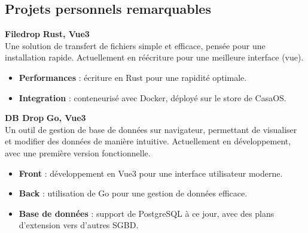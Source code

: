 \documentclass[a4paper,10pt]{article}
\begin{document}
\begin{paracol}{2}
\begin{flushleft}
  \section*{Projets personnels remarquables}

  \textbf{Filedrop} \hfill \textbf{Rust, Vue3} \\
  Une solution de transfert de fichiers simple et efficace, pensée pour une installation rapide.
  Actuellement en réécriture pour une meilleure interface (vue).
  \begin{itemize}[left=0pt,label={--},nosep]
    \item \textbf{Performances} : écriture en Rust pour une rapidité optimale.
    \item \textbf{Integration} : conteneurisé avec Docker, déployé sur le store de CasaOS.
  \end{itemize}
  \vspace{1em}

  \textbf{DB Drop} \hfill \textbf{Go, Vue3} \\
  Un outil de gestion de base de données sur navigateur, permettant de visualiser et modifier des données de manière intuitive.
  Actuellement en développement, avec une première version fonctionnelle.
  \begin{itemize}[left=0pt,label={--},nosep]
    \item \textbf{Front} : développement en Vue3 pour une interface utilisateur moderne.
    \item \textbf{Back} : utilisation de Go pour une gestion de données efficace.
    \item \textbf{Base de données} : support de PostgreSQL à ce jour, avec des plans d'extension vers d'autres SGBD.
  \end{itemize}
  \vspace{1em}

  \end{flushleft}
  
\end{paracol}
\end{document}

